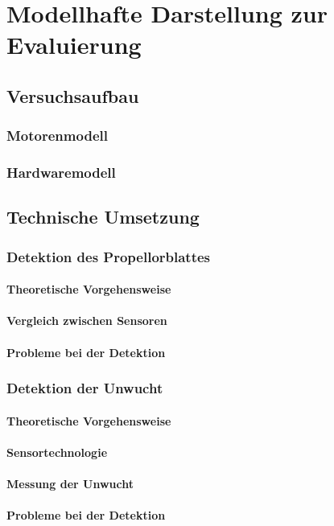 
\chapter{Modellhafte Darstellung zur Evaluierung}

\section{Versuchsaufbau}

\subsection{Motorenmodell}

\subsection{Hardwaremodell}

\section{Technische Umsetzung}

\subsection{Detektion des Propellorblattes}

\subsubsection*{Theoretische Vorgehensweise}

\subsubsection*{Vergleich zwischen Sensoren}

\subsubsection*{Probleme bei der Detektion}

\subsection{Detektion der Unwucht}

\subsubsection*{Theoretische Vorgehensweise}

\subsubsection*{Sensortechnologie}

\subsubsection*{Messung der Unwucht}

\subsubsection*{Probleme bei der Detektion}

